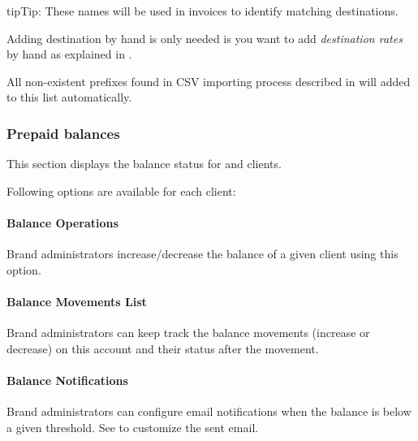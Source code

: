 \documentclass[letterpaper,10pt,english]{sphinxmanual}
\begin{document}
\begin{notice}{tip}{Tip:}
These names will be used in invoices to identify matching destinations.
\end{notice}

Adding destination by hand is only needed is you want to add \emph{destination rates} by hand as explained in {\hyperref[administration_portal/brand/billing/destination_rates:add\string-rates\string-manually]{}}.

All non-existent prefixes found in CSV importing process described in {\hyperref[administration_portal/brand/billing/destination_rates:importing\string-a\string-csv\string-file]{}} will added to this list
automatically.


\subsubsection{Prepaid balances}
\label{administration_portal/brand/billing/prepaid_balances::doc}\label{administration_portal/brand/billing/prepaid_balances:prepaid-balances}
This section displays the balance status for {\hyperref[administration_portal/brand/billing/index:prepaid\string-billing]{}} and {\hyperref[administration_portal/brand/billing/index:pseudo\string-prepaid\string-billing]{}} clients.

Following options are available for each client:


\paragraph{Balance Operations}
\label{administration_portal/brand/billing/prepaid_balances:balance-operations}
Brand administrators increase/decrease the balance of a given client using this option.


\paragraph{Balance Movements List}
\label{administration_portal/brand/billing/prepaid_balances:balance-movements-list}
Brand administrators can keep track the balance movements (increase or decrease) on this account and their status
after the movement.


\paragraph{Balance Notifications}
\label{administration_portal/brand/billing/prepaid_balances:balance-notifications}
Brand administrators can configure email notifications when the balance is below a given threshold. See
{\hyperref[administration_portal/brand/settings/notification_templates:notification\string-templates]{}} to customize the sent email.
\end{document}
